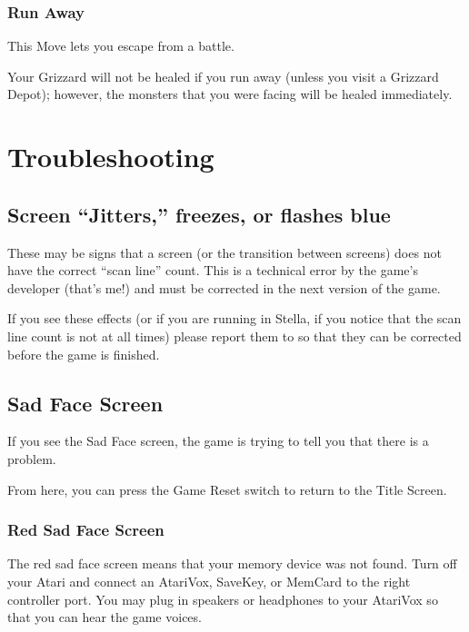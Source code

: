 \documentclass[12pt,openright,book]{memoir}
\begin{document}
\begin{description}
\subsection{Run Away}

This Move lets you escape from a battle.

Your  Grizzard will  not be  healed if  you run  away (unless  you visit
a  Grizzard Depot);  however, the  monsters  that you  were facing  will
be healed immediately.



\chapter{Troubleshooting}

\ifdefined\DEMO

\section{Screen ``Jitters,'' freezes, or flashes blue}

These may  be signs that  a screen  (or the transition  between screens)
does not have the correct ``scan line'' count. This is a technical error
by the game's  developer (that's me!) and must be  corrected in the next
version of the game.

If you see these effects (or if you are running in Stella, if you notice
that the scan  line count is not \ifdefined{}   \fi at
all         times)         please         report         them         to
 so  that they
can be corrected before the game is finished.

\fi

\section{Sad Face Screen}

If you  see the Sad  Face screen,  the game is  trying to tell  you that
there is a problem.

From  here,  you can  press  the  Game Reset  switch  to  return to  the
Title Screen.

\subsection{Red Sad Face Screen}

The red  sad face screen  means that your  memory device was  not found.
Turn off your Atari and connect  an AtariVox, SaveKey, or MemCard to the
right controller  port. You may plug  in speakers or headphones  to your
AtariVox so that you can hear the game voices.


\end{description}
\end{document}

